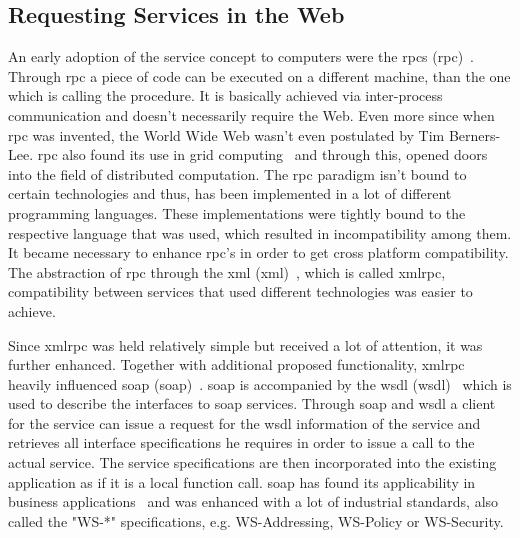 \subsection{Requesting Services in the Web}
An early adoption of the service concept to computers were the \textrm{\acrlong{rpc}}s (\acrshort{rpc})~\cite{Birrell:1984:IRP:2080.357392}.
Through \textrm{\acrshort{rpc}} a piece of code can be executed on a different machine, than the one which is calling the procedure.
It is basically achieved via inter-process communication and doesn't necessarily require the Web.
Even more since when \textrm{\acrshort{rpc}} was invented, the \textrm{World Wide Web} wasn't even postulated by Tim Berners-Lee. 
\textrm{\acrshort{rpc}} also found its use in grid computing~\cite{seymour2002overview} and through this, opened doors into the field of distributed computation.
The \textrm{\acrshort{rpc}} paradigm isn't bound to certain technologies and thus, has been implemented in a lot of different programming languages.
These implementations were tightly bound to the respective language that was used, which resulted in incompatibility among them.
It became necessary to enhance \textrm{\acrshort{rpc}}'s in order to get cross platform compatibility.
The abstraction of \textrm{\acrshort{rpc}} through the \textrm{\acrlong{xml}} (\textrm{\acrshort{xml}})~\cite{bray1998extensible}, which is called \textrm{\acrshort{xmlrpc}}, compatibility between services that used different technologies was easier to achieve.

Since \textrm{\acrshort{xmlrpc}} was held relatively simple but received a lot of attention, it was further enhanced.
Together with additional proposed functionality, \textrm{\acrshort{xmlrpc}} heavily influenced \textrm{\acrlong{soap}} (\textrm{\acrshort{soap}})~\cite{box2000simple}.
\textrm{\acrshort{soap}} is accompanied by the \acrlong{wsdl} (\textrm{\acrshort{wsdl}})~\cite{christensen2001web} which is used to describe the interfaces to \acrshort{soap} services.
Through \textrm{\acrshort{soap}} and \textrm{\acrshort{wsdl}} a client for the service can issue a request for the \textrm{\acrshort{wsdl}} information of the service and retrieves all interface specifications he requires in order to issue a call to the actual service.
The service specifications are then incorporated into the existing application as if it is a local function call.
\textrm{\acrshort{soap}} has found its applicability in business applications~\cite{journals/itpro/BarrosD06} and was enhanced with a lot of industrial standards, also called the "WS-*" specifications, e.g. WS-Addressing, WS-Policy or WS-Security.

